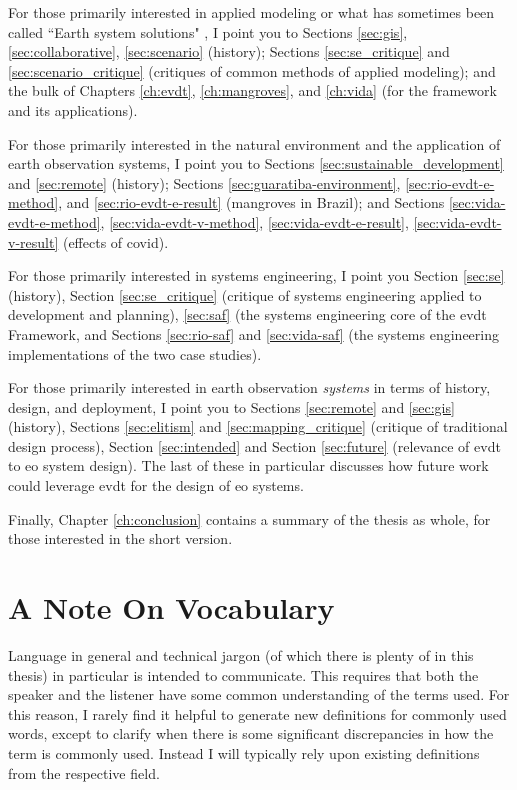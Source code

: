 For those primarily interested in applied modeling or what has sometimes been called ``Earth system solutions" \cite{jonesGainingSeatPolicy2002}, I point you to Sections \ref{sec:gis}, \ref{sec:collaborative}, \ref{sec:scenario} (history); Sections \ref{sec:se_critique} and \ref{sec:scenario_critique} (critiques of common methods of applied modeling); and the bulk of Chapters \ref{ch:evdt}, \ref{ch:mangroves}, and \ref{ch:vida} (for the framework and its applications).

For those primarily interested in the natural environment and the application of earth observation systems, I point you to Sections \ref{sec:sustainable_development} and \ref{sec:remote} (history); Sections \ref{sec:guaratiba-environment}, \ref{sec:rio-evdt-e-method}, and \ref{sec:rio-evdt-e-result} (mangroves in Brazil); and Sections \ref{sec:vida-evdt-e-method},  \ref{sec:vida-evdt-v-method}, \ref{sec:vida-evdt-e-result}, \ref{sec:vida-evdt-v-result} (effects of \acs{covid}).

For those primarily interested in systems engineering, I point you Section \ref{sec:se} (history), Section \ref{sec:se_critique} (critique of systems engineering applied to development and planning), \ref{sec:saf} (the systems engineering core of the \ac{evdt} Framework, and Sections \ref{sec:rio-saf} and \ref{sec:vida-saf} (the systems engineering implementations of the two case studies).

For those primarily interested in earth observation \textit{systems} in terms of history, design, and deployment, I point you to Sections \ref{sec:remote} and \ref{sec:gis} (history), Sections \ref{sec:elitism} and \ref{sec:mapping_critique} (critique of traditional design process), Section \ref{sec:intended} and Section \ref{sec:future} (relevance of \ac{evdt} to \ac{eo} system design). The last of these in particular discusses how future work could leverage \ac{evdt} for the design of \ac{eo} systems.

Finally, Chapter \ref{ch:conclusion} contains a summary of the thesis as whole, for those interested in the short version.

\section{A Note On Vocabulary} \label{sec:vocabulary}

Language in general and technical jargon (of which there is plenty of in this thesis) in particular is intended to communicate. This requires that both the speaker and the listener have some common understanding of the terms used. For this reason, I rarely find it helpful to generate new definitions for commonly used words, except to clarify when there is some significant discrepancies in how the term is commonly used. Instead I will typically rely upon existing definitions from the respective field.

